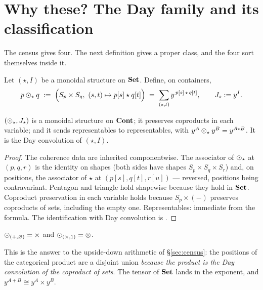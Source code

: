 \section{Why these? The Day family and its classification}
\label{sec:day}

The census gives four. The next definition gives a proper class, and the four
sort themselves inside it.

\begin{Definition}
\label{def:day}
Let $(\star, I)$ be a monoidal structure on $\mathbf{Set}$. Define, on containers,
\[
  p\mathbin{\odot}_\star q \;:=\;\Bigl(S_p\times S_q,\ (s,t)\mapsto p[s]\star q[t]\Bigr)
   \;=\;\sum_{(s,t)} y^{\,p[s]\,\star\,q[t]},
  \qquad J_\star := y^{I}.
\]
\end{Definition}

\begin{Proposition}\label{prop:dayday}
$(\mathbin{\odot}_\star, J_\star)$ is a monoidal structure on $\mathbf{Cont}$; it preserves
coproducts in each variable; and it sends representables to representables, with
$y^A\mathbin{\odot}_\star y^B=y^{A\star B}$. It is the Day convolution of $(\star,I)$.
\end{Proposition}

\begin{proof}
The coherence data are inherited componentwise. The associator of $\mathbin{\odot}_\star$
at $(p,q,r)$ is the identity on shapes (both sides have shapes
$S_p\times S_q\times S_r$) and, on positions, the associator of $\star$ at
$(p[s],q[t],r[u])$ --- reversed, positions being contravariant. Pentagon and
triangle hold shapewise because they hold in $\mathbf{Set}$. Coproduct preservation in
each variable holds because $S_p\times(-)$ preserves coproducts of sets,
including the empty one. Representables: immediate from the formula. The
identification with Day convolution is \cite[Prop.~3.79]{NiuSpivak}.
\end{proof}

\begin{Example}\label{ex:twoare}
$\mathbin{\odot}_{(+,\varnothing)}=\times$ and $\mathbin{\odot}_{(\times,1)}=\mathbin{\otimes}$.
\end{Example}

This is the answer to the upside-down arithmetic of §\ref{sec:census}: the
positions of the categorical product are a disjoint union \emph{because the
product is the Day convolution of the coproduct of sets}. The tensor of $\mathbf{Set}$
lands in the exponent, and $y^{A+B}\cong y^A\times y^B$.

